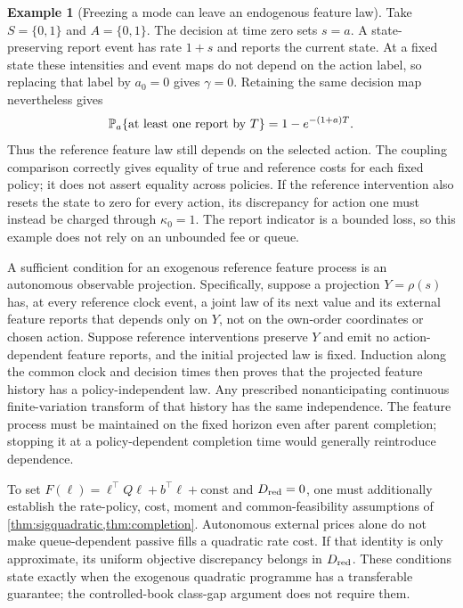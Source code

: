 \documentclass[11pt]{article}
\numberwithin{equation}{section}
\theoremstyle{definition}
\theoremstyle{remark}
\theoremstyle{definition}
\newtheorem{example}[theorem]{Example}
\newcommand{\Pp}{\mathbb P}
\begin{document}
\begin{example}[Freezing a mode can leave an endogenous feature law]
\label{ex:modefreezing}
Take $S=\{0,1\}$ and $A=\{0,1\}$. The decision at time zero sets
$s=a$. A state-preserving report event has rate $1+s$ and reports the
current state. At a fixed state these intensities and event maps do not
depend on the action label, so replacing that label by $a_0=0$ gives
$\gamma=0$. Retaining the same decision map nevertheless gives
\[
 \Pp_a\{\hbox{at least one report by }T\}=1-e^{-(1+a)T}.
\]
Thus the reference feature law still depends on the selected action.
The coupling comparison correctly gives equality of true and reference
costs for each fixed policy; it does not assert equality across policies.
If the reference intervention also resets the state to zero for every
action, its discrepancy for action one must instead be charged through
$\kappa_0=1$. The report indicator is a bounded loss, so this example
does not rely on an unbounded fee or queue.
\end{example}

A sufficient condition for an exogenous reference feature process is an
autonomous observable projection. Specifically, suppose a projection
$Y=\rho(s)$ has, at every reference clock event, a joint law of its next
value and its external feature reports that depends only on $Y$, not on
the own-order coordinates or chosen action. Suppose reference
interventions preserve $Y$ and emit no action-dependent feature reports,
and the initial projected law is fixed. Induction along the common clock
and decision times then proves that the projected feature history has a
policy-independent law. Any prescribed nonanticipating continuous
finite-variation transform of that history has the same independence.
The feature process must be maintained on the fixed horizon even after
parent completion; stopping it at a policy-dependent completion time would
generally reintroduce dependence.

To set $F(\ell)=\ell^\top Q\ell+b^\top\ell+\mathrm{const}$ and
$D_{\rm red}=0$, one must additionally establish the rate-policy, cost,
moment and common-feasibility assumptions of
\cref{thm:sigquadratic,thm:completion}. Autonomous external prices alone
do not make queue-dependent passive fills a quadratic rate cost. If that
identity is only approximate, its uniform objective discrepancy belongs in
$D_{\rm red}$. These conditions state exactly when the exogenous quadratic
programme has a transferable guarantee; the controlled-book class-gap
argument does not require them.
\end{document}
